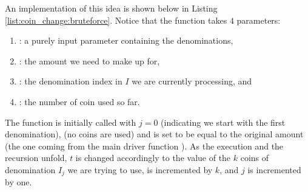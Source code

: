 An implementation of this idea is shown below in Listing \ref{list:coin_change:bruteforce}.
Notice that the function  takes $4$ parameters:
\begin{enumerate}
	\item {}: a purely input parameter containing the denominations,
	\item {}: the amount we need to make up for,
	\item {}: the denomination index in $I$ we are currently processing, and
	\item {}: the number of coin used so far.
\end{enumerate}




The function is initially called with $j=0$ (indicating we start with the first denomination),  (no coins are used) and  is set to be equal to the original amount (the one coming from the main driver function ).
As the execution and the recursion unfold, $t$ is changed accordingly to the value of the $k$ coins of denomination $I_j$ we are trying to use,  is incremented by $k$, and $j$ is incremented by one.

